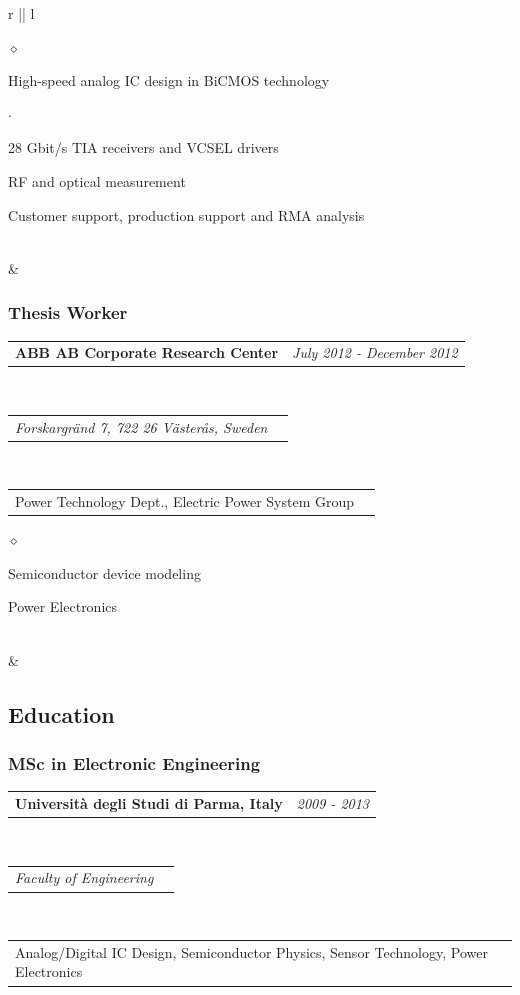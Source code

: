 \documentclass[a4paper]{article}
\makeatletter
\newlength{\sectsep}
\newcommand{\headerrow}[2]
{\begin{tabular*}{\textwidth}{l@{\extracolsep{\fill}}r}
	#1 &
	#2 \\
\end{tabular*}}
\renewenvironment{itemize}{
  \begin{list}{$\diamond$}{
    \setlength{\topsep}{0.25em}
    \setlength{\itemsep}{0em}
    \setlength{\parskip}{0pt}
    \setlength{\parsep}{0em}
  }
}{
  \end{list}
}
\newenvironment{itemize2}{
  \begin{list}{$\cdot$}{
    \setlength{\topsep}{0.25em}
    \setlength{\itemsep}{0em}
    \setlength{\parskip}{0pt}
    \setlength{\parsep}{0em}
  }
}{
  \end{list}
}
\makeatother
\begin{document}
\begin{longtable}{r || l}
\begin{minipage}{0.9\textwidth}
      \begin{itemize}
          \item High-speed analog IC design in BiCMOS technology
          \begin{itemize2}
              \item 28 Gbit/s TIA receivers and VCSEL drivers
          \end{itemize2}
          \item RF and optical measurement
          \item Customer support, production support and RMA analysis
      \end{itemize}
  \end{minipage} \\[\sectsep]

  & \begin{minipage}{0.9\textwidth}
      \vspace{\sectsep}
      \subsubsection*{Thesis Worker}
      \headerrow
  		{\textbf{ABB AB Corporate Research Center}}{\emph{July 2012 - December 2012}}
      \\
      \headerrow
        {\emph{Forskargränd 7, 722 26 Västerås, Sweden}}{}
      \\
      \headerrow
          {Power Technology Dept., Electric Power System Group}{}

      \begin{itemize}
          \item Semiconductor device modeling
          \item Power Electronics
      \end{itemize}
  \end{minipage} \\[\sectsep]

  & \begin{minipage}{0.9\textwidth}
      \vspace{\sectsep}
      \subsection*{Education}
      \subsubsection*{MSc in Electronic Engineering}
      \headerrow
  		{\textbf{Università degli Studi di Parma, Italy}}{\emph{2009 - 2013}}
      \\
      \headerrow
        {\emph{Faculty of Engineering}}{}
      \\
      \headerrow
        {Analog/Digital IC Design, Semiconductor Physics, Sensor Technology, Power Electronics}{}


\end{minipage}
\end{longtable}
\end{document}
